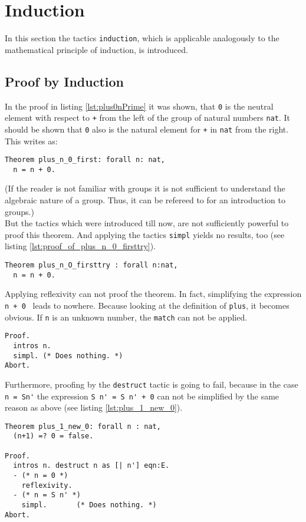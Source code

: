 \section{Induction}
In this section the tactics \lstinline!induction!, which is applicable analogously to the mathematical principle of induction, is introduced.

\subsection{Proof by Induction}
In the proof in listing \ref{lst:plus0nPrime} it was shown, 
that \lstinline!0! is the neutral element with respect to \lstinline!+! from the left of the group of natural numbers \lstinline!nat!. 
It should be shown that \lstinline!0! also is the natural element for \lstinline!+! in \lstinline!nat! from the right. 
This writes as:
\begin{lstlisting}[caption = \lstinline!plus_n_0_first!, label= lst:plus_n_0_first]
Theorem plus_n_0_first: forall n: nat,
  n = n + 0.  
\end{lstlisting}
(If the reader is not familiar with groups it is not sufficient to understand the algebraic nature of a group.
 Thus, it can be refereed to \cite{S} for an introduction to groups.)\\
But the tactics which were introduced till now, are not sufficiently powerful to proof this theorem.
And applying the tactics \lstinline!simpl! yields no results, too (see listing \ref{lst:proof_of_plus_n_0_firsttry}).
\begin{lstlisting}[caption = \lstinline!plus_n_O_firsttry!, label=lst:plus_n_0_firsttry] 
Theorem plus_n_O_firsttry : forall n:nat,
  n = n + 0.
\end{lstlisting}

Applying reflexivity can not proof the theorem. In fact, simplifying the expression \lstinline!n + 0 ! leads to nowhere.
Because looking at the definition of \lstinline!plus!, it becomes obvious.
If \lstinline!n! is an unknown number, the \lstinline!match! can not be applied.
  
\begin{lstlisting}[caption= \lstinline!Proof! of \lstinline!plus_n_0_firsttry!, label = lst:proof_of_plus_n_0_firsttry]
Proof.
  intros n.
  simpl. (* Does nothing. *)
Abort.
\end{lstlisting}

Furthermore, proofing by the \lstinline!destruct! tactic is going to fail, because in the case \lstinline!n = Sn'! the expression \lstinline!S n' = S n' + 0! can not be simplified by the same reason as above (see listing \ref{lst:plus_1_new_0}).
\begin{lstlisting}[caption = \lstinline!plus_1_new_0!, label = lst:plus_1_new_0]
Theorem plus_1_new_0: forall n : nat,
  (n+1) =? 0 = false. 
 
Proof.
  intros n. destruct n as [| n'] eqn:E.
  - (* n = 0 *)
    reflexivity. 
  - (* n = S n' *)
    simpl.       (* Does nothing. *)
Abort.
\end{lstlisting}

